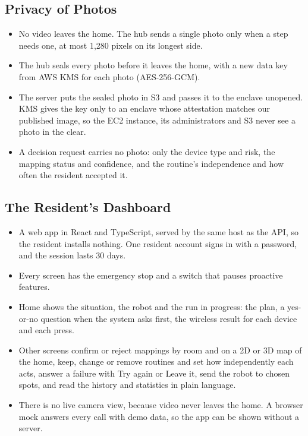\documentclass[conference]{IEEEtran}
\begin{document}
\subsection{Privacy of Photos}
\begin{itemize}
\item No video leaves the home. The hub sends a single photo only when a step needs one, at most 1,280 pixels on its longest side.
\item The hub seals every photo before it leaves the home, with a new data key from AWS KMS for each photo (AES-256-GCM).
\item The server puts the sealed photo in S3 and passes it to the enclave unopened. KMS gives the key only to an enclave whose attestation matches our published image, so the EC2 instance, its administrators and S3 never see a photo in the clear.
\item A decision request carries no photo: only the device type and risk, the mapping status and confidence, and the routine's independence and how often the resident accepted it.
\end{itemize}

\subsection{The Resident's Dashboard}
\begin{itemize}
\item A web app in React and TypeScript, served by the same host as the API, so the resident installs nothing. One resident account signs in with a password, and the session lasts 30 days.
\item Every screen has the emergency stop and a switch that pauses proactive features.
\item Home shows the situation, the robot and the run in progress: the plan, a yes-or-no question when the system asks first, the wireless result for each device and each press.
\item Other screens confirm or reject mappings by room and on a 2D or 3D map of the home, keep, change or remove routines and set how independently each acts, answer a failure with Try again or Leave it, send the robot to chosen spots, and read the history and statistics in plain language.
\item There is no live camera view, because video never leaves the home. A browser mock answers every call with demo data, so the app can be shown without a server.
\end{itemize}
\end{document}

